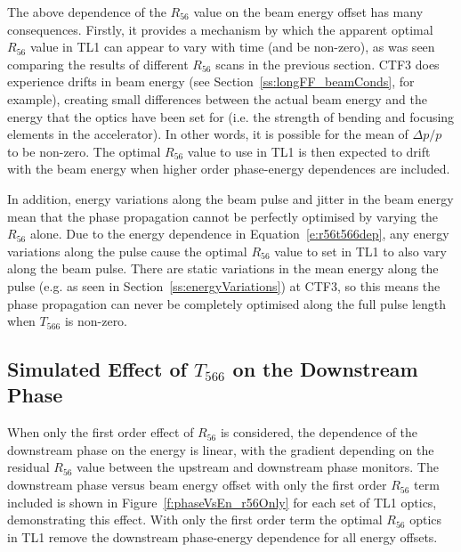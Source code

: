 The above dependence of the \(R_{56}\) value on the beam energy offset has many consequences. Firstly, it provides a mechanism by which the apparent optimal \(R_{56}\) value in TL1 can appear to vary with time (and be non-zero), as was seen comparing the results of different \(R_{56}\) scans in the previous section. CTF3 does experience drifts in beam energy (see Section~\ref{ss:longFF_beamConds}, for example), creating small differences between the actual beam energy and the energy that the optics have been set for (i.e. the strength of bending and focusing elements in the accelerator). In other words, it is possible for the mean of \(\Delta p / p\) to be non-zero. The optimal \(R_{56}\) value to use in TL1 is then expected to drift with the beam energy when higher order phase-energy dependences are included.

In addition, energy variations along the beam pulse and jitter in the beam energy mean that the phase propagation cannot be perfectly optimised by varying the \(R_{56}\) alone. Due to the energy dependence in Equation~\ref{e:r56t566dep}, any energy variations along the pulse cause the optimal \(R_{56}\) value to set in TL1 to also vary along the beam pulse. There are static variations in the mean energy along the pulse (e.g. as seen in Section~\ref{ss:energyVariations}) at CTF3, so this means the phase propagation can never be completely optimised along the full pulse length when \(T_{566}\) is non-zero. 

\subsection{Simulated Effect of \(T_{566}\) on the Downstream Phase}
\label{ss:t566Sim}

When only the first order effect of \(R_{56}\) is considered, the dependence of the downstream phase on the energy is linear, with the gradient depending on the residual \(R_{56}\) value between the upstream and downstream phase monitors. The downstream phase versus beam energy offset with only the first order \(R_{56}\) term included is shown in Figure~\ref{f:phaseVsEn_r56Only} for each set of TL1 optics, demonstrating this effect. With only the first order term the optimal \(R_{56}\) optics in TL1 remove the downstream phase-energy dependence for all energy offsets.

